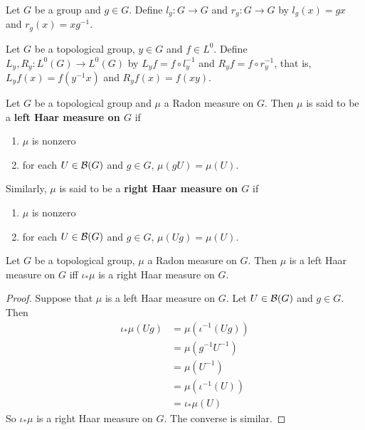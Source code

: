 \documentclass{book}
\begin{document}
	\begin{defn}  
		Let $G$ be a group and $g \in G$. Define $l_g:G \rightarrow G$ and $r_g:G \rightarrow G$ by $l_g(x) = gx$ and $r_g(x) = xg^{-1}$. 
	\end{defn}

	\begin{defn}  
		Let $G$ be a topological group, $y \in G$ and $f \in L^0$.  Define $L_y, R_y: L^0(G) \rightarrow L^0(G)$ by $L_y f = f \circ l_y^{-1}$ and $R_y f = f \circ r_y^{-1}$, that is, $L_yf(x) = f(y^{-1}x)$ and $R_yf(x) = f(xy)$.
	\end{defn}
	
	\begin{defn}  
		Let $G$ be a topological group and $\mu$ a Radon measure on $G$. Then $\mu$ is said to be a \textbf{left Haar measure on $G$} if 
		\begin{enumerate}
			\item $\mu$ is nonzero  
			\item for each $U \in \mathcal{B}(G)$ and $g \in G$, $\mu(gU) = \mu(U)$.  
		\end{enumerate}
		Similarly, $\mu$ is said to be a \textbf{right Haar measure on $G$} if 
		\begin{enumerate}
			\item $\mu$ is nonzero  
			\item for each $U \in \mathcal{B}(G)$ and $g \in G$, $\mu(Ug) = \mu(U)$.  
		\end{enumerate}
	\end{defn}
	
	\begin{ex}  
		Let $G$ be a topological group, $\mu$ a Radon measure on $G$. Then $\mu$ is a left Haar measure on $G$ iff $\iota_*\mu$ is a right Haar measure on $G$. 
	\end{ex}
	
	\begin{proof}
		Suppose that $\mu$ is a left Haar measure on $G$. Let $U \in \mathcal{B}(G)$ and $g \in G$. Then 
		\begin{align*}
			\iota_*\mu(Ug)
			& = \mu(\iota^{-1}(Ug)) \\
			&= \mu (g^{-1}U^{-1}) \\
			&= \mu (U^{-1}) \\
			&= \mu(\iota^{-1}(U)) \\
			&= \iota_*\mu(U)
		\end{align*}
		So $\iota_*\mu$ is a right Haar measure on $G$. The converse is similar.
	\end{proof}
\end{document}
